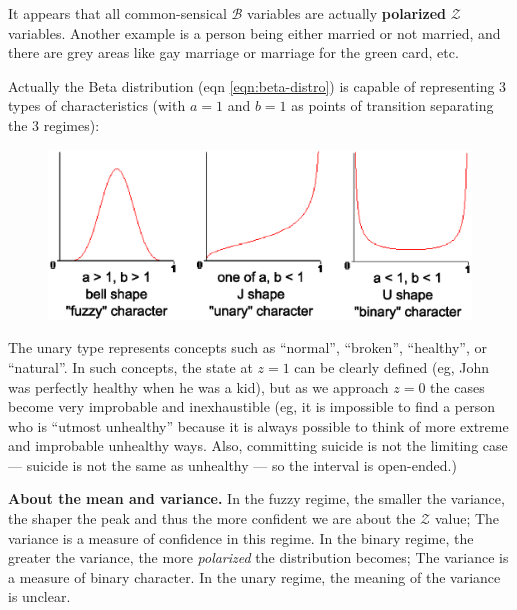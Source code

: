 It appears that all common-sensical $\mathcal{B}$ variables are actually \textbf{polarized} $\mathcal{Z}$ variables.  Another example is a person being either married or not married, and there are grey areas like gay marriage or marriage for the green card, etc.

Actually the Beta distribution (eqn \ref{eqn:beta-distro}) is capable of representing 3 types of characteristics (with $a = 1$ and $b = 1$ as points of transition separating the 3 regimes):
\begin{figure}[H]
\centering
\includegraphics[scale=0.8]{binary-fuzzy-unary-characters.eps}
\end{figure}
The unary type represents concepts such as ``normal'', ``broken'', ``healthy'', or ``natural''.  In such concepts, the state at $z = 1$ can be clearly defined (eg, John was perfectly healthy when he was a kid), but as we approach $z = 0$ the cases become very improbable and inexhaustible (eg, it is impossible to find a person who is ``utmost unhealthy'' because it is always possible to think of more extreme and improbable unhealthy ways.  Also, committing suicide is not the limiting case --- suicide is not the same as unhealthy --- so the interval is open-ended.)

\textbf{About the mean and variance.}  In the fuzzy regime, the smaller the variance, the shaper the peak and thus the more confident we are about the $\mathcal{Z}$ value;  The variance is a measure of confidence in this regime.  In the binary regime, the greater the variance, the more \textit{polarized} the distribution becomes;  The variance is a measure of binary character.  In the unary regime, the meaning of the variance is unclear.



